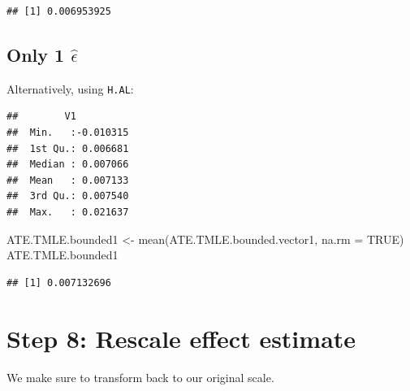 \documentclass[
]{book}
\newenvironment{Shaded}{\begin{snugshade}}{\end{snugshade}}
\newcommand{\AttributeTok}[1]{\textcolor[rgb]{0.77,0.63,0.00}{#1}}
\newcommand{\ConstantTok}[1]{\textcolor[rgb]{0.00,0.00,0.00}{#1}}
\newcommand{\FunctionTok}[1]{\textcolor[rgb]{0.00,0.00,0.00}{#1}}
\newcommand{\NormalTok}[1]{#1}
\newcommand{\OtherTok}[1]{\textcolor[rgb]{0.56,0.35,0.01}{#1}}
\newcommand{\SpecialCharTok}[1]{\textcolor[rgb]{0.00,0.00,0.00}{#1}}
\begin{document}
\begin{verbatim}
## [1] 0.006953925
\end{verbatim}

\hypertarget{only-1-hatepsilon-2}{%
\subsection{\texorpdfstring{Only 1 \(\hat\epsilon\)}{Only 1 \textbackslash hat\textbackslash epsilon}}\label{only-1-hatepsilon-2}}

Alternatively, using \texttt{H.AL}:

\begin{Shaded}
\end{Shaded}

\begin{verbatim}
##        V1           
##  Min.   :-0.010315  
##  1st Qu.: 0.006681  
##  Median : 0.007066  
##  Mean   : 0.007133  
##  3rd Qu.: 0.007540  
##  Max.   : 0.021637
\end{verbatim}

\begin{Shaded}
\begin{Highlighting}[]
\NormalTok{ATE.TMLE.bounded1 }\OtherTok{\textless{}{-}} \FunctionTok{mean}\NormalTok{(ATE.TMLE.bounded.vector1, }
                         \AttributeTok{na.rm =} \ConstantTok{TRUE}\NormalTok{) }
\NormalTok{ATE.TMLE.bounded1 }
\end{Highlighting}
\end{Shaded}

\begin{verbatim}
## [1] 0.007132696
\end{verbatim}

\hypertarget{step-8-rescale-effect-estimate}{%
\section{Step 8: Rescale effect estimate}\label{step-8-rescale-effect-estimate}}

We make sure to transform back to our original scale.
\end{document}
